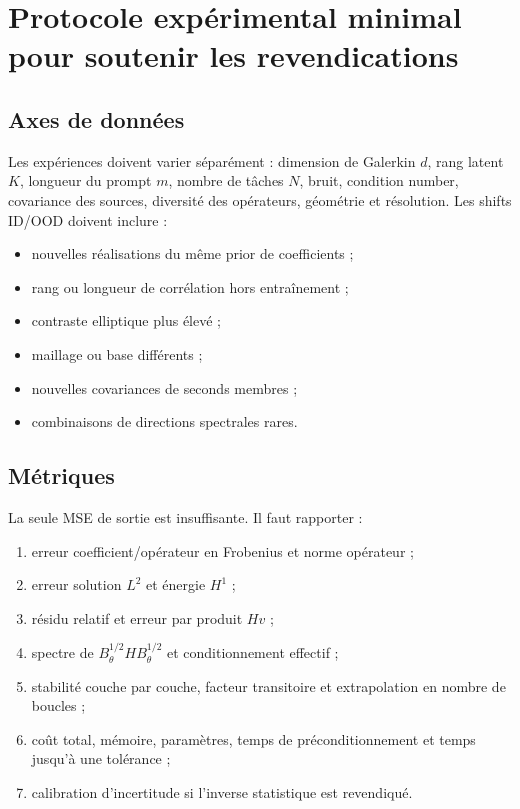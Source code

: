 \documentclass[11pt,a4paper]{article}
\begin{document}
\section{Protocole expérimental minimal pour soutenir les revendications}

\subsection{Axes de données}

Les expériences doivent varier séparément : dimension de Galerkin $d$, rang
latent $K$, longueur du prompt $m$, nombre de tâches $N$, bruit, condition
number, covariance des sources, diversité des opérateurs, géométrie et
résolution. Les shifts ID/OOD doivent inclure :
\begin{itemize}[leftmargin=*]
  \item nouvelles réalisations du même prior de coefficients ;
  \item rang ou longueur de corrélation hors entraînement ;
  \item contraste elliptique plus élevé ;
  \item maillage ou base différents ;
  \item nouvelles covariances de seconds membres ;
  \item combinaisons de directions spectrales rares.
\end{itemize}

\subsection{Métriques}

La seule MSE de sortie est insuffisante. Il faut rapporter :
\begin{enumerate}[leftmargin=*]
  \item erreur coefficient/opérateur en Frobenius et norme opérateur ;
  \item erreur solution $L^2$ et énergie $H^1$ ;
  \item résidu relatif et erreur par produit $Hv$ ;
  \item spectre de $B_\theta^{1/2}HB_\theta^{1/2}$ et conditionnement effectif ;
  \item stabilité couche par couche, facteur transitoire et extrapolation en
  nombre de boucles ;
  \item coût total, mémoire, paramètres, temps de préconditionnement et temps
  jusqu'à une tolérance ;
  \item calibration d'incertitude si l'inverse statistique est revendiqué.
\end{enumerate}
\end{document}
